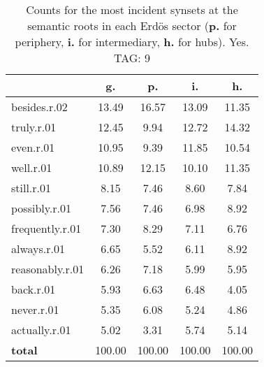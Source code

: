 \begin{table}[h!]
\begin{center}
\begin{tabular}{| l || c | c | c | c |}\hline
 & {\bf g.} & {\bf p.} & {\bf i.} & {\bf h.} \\\hline\hline
besides.r.02 & 13.49  & 16.57  & 13.09  & 11.35 \\\hline
truly.r.01 & 12.45  & 9.94  & 12.72  & 14.32 \\\hline
even.r.01 & 10.95  & 9.39  & 11.85  & 10.54 \\\hline
well.r.01 & 10.89  & 12.15  & 10.10  & 11.35 \\\hline
still.r.01 & 8.15  & 7.46  & 8.60  & 7.84 \\\hline
possibly.r.01 & 7.56  & 7.46  & 6.98  & 8.92 \\\hline
frequently.r.01 & 7.30  & 8.29  & 7.11  & 6.76 \\\hline
always.r.01 & 6.65  & 5.52  & 6.11  & 8.92 \\\hline
reasonably.r.01 & 6.26  & 7.18  & 5.99  & 5.95 \\\hline
back.r.01 & 5.93  & 6.63  & 6.48  & 4.05 \\\hline
never.r.01 & 5.35  & 6.08  & 5.24  & 4.86 \\\hline
actually.r.01 & 5.02  & 3.31  & 5.74  & 5.14 \\\hline\hline
{{\bf total}} & 100.00  & 100.00  & 100.00  & 100.00 \\\hline
\end{tabular}
\caption{Counts for the most incident synsets at the semantic roots in each Erd\"os sector ({\bf p.} for periphery, {\bf i.} for intermediary, {\bf h.} for hubs). Yes. TAG: 9}
\end{center}
\end{table}